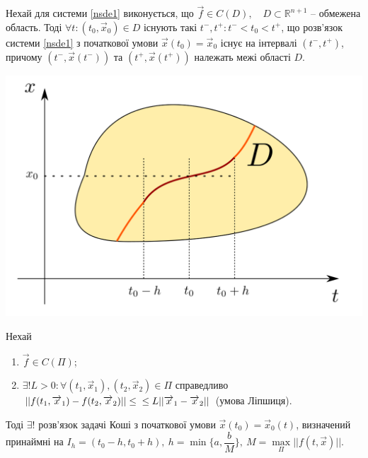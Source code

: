 \documentclass[14pt,a4paper]{scrartcl}
\theoremstyle{definition}
\theoremstyle{definition}
\theoremstyle{definition}
\begin{document}
\begin{boxteo}
Нехай для системи \eqref{nsde1} виконується, що $\overrightarrow{f} \in C(D), \quad D \subset \mathbb{R}^{n + 1}$ -- обмежена область. Тоді $\forall t : (t_0, \overrightarrow{x}_0) \in D$ існують такі $t^{-}, t^{+} : t^{-} < t_0 < t^{+}$, що розв'язок системи \eqref{nsde1} з початкової умови $\overrightarrow{x}(t_0) = \overrightarrow{x}_0$ існує на інтервалі $(t^{-}, t^{+})$, причому $(t^{-}, \overrightarrow{x}(t^{-})) \text{ та } (t^{+}, \overrightarrow{x}(t^{+}))$ належать межі області $D$.
    \begin{center} \includegraphics[scale=0.35]{assets/lect0.png} \end{center}
\end{boxteo}

\begin{boxteo}
  Нехай
  \begin{spacing}{1}
  \begin{enumerate}
    \item $\overrightarrow{f} \in C(\Pi)$;
    \item $\exists! L > 0 : \forall (t_1, \overrightarrow{x}_1), (t_2, \overrightarrow{x}_2) \in \Pi$ справедливо $|| f(t_1, \overrightarrow{x}_1) - f(t_2, \overrightarrow{x}_2)|| \leq \\ \leq L||\overrightarrow{x}_1 - \overrightarrow{x}_2||$ (умова Ліпшиця).
  \end{enumerate}
  \end{spacing}


  Тоді $\exists!$ розв'язок задачі Коші з початкової умови $\overrightarrow{x}(t_0) = \overrightarrow{x}_0(t)$, визначений принаймні на $I_h = (t_0 - h, t_0 + h), \  h = \min\{{a, \dfrac{b}{M}}\}, \  M = \max\limits_{\Pi}||f(t, \overrightarrow{x})||$.
\end{boxteo}
\end{document}
